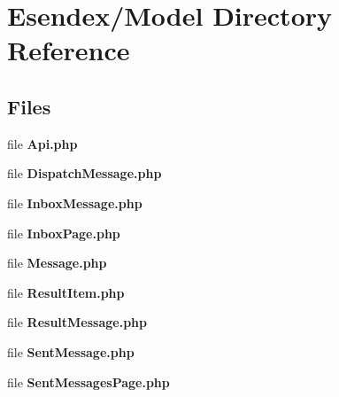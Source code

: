 \section{Esendex/\-Model Directory Reference}
\label{dir_034d9ecfda6de79a64c74a909bf54367}
\subsection*{Files}
\begin{DoxyCompactItemize}
\item 
file {\bfseries Api.\-php}
\item 
file {\bfseries Dispatch\-Message.\-php}
\item 
file {\bfseries Inbox\-Message.\-php}
\item 
file {\bfseries Inbox\-Page.\-php}
\item 
file {\bfseries Message.\-php}
\item 
file {\bfseries Result\-Item.\-php}
\item 
file {\bfseries Result\-Message.\-php}
\item 
file {\bfseries Sent\-Message.\-php}
\item 
file {\bfseries Sent\-Messages\-Page.\-php}
\end{DoxyCompactItemize}
